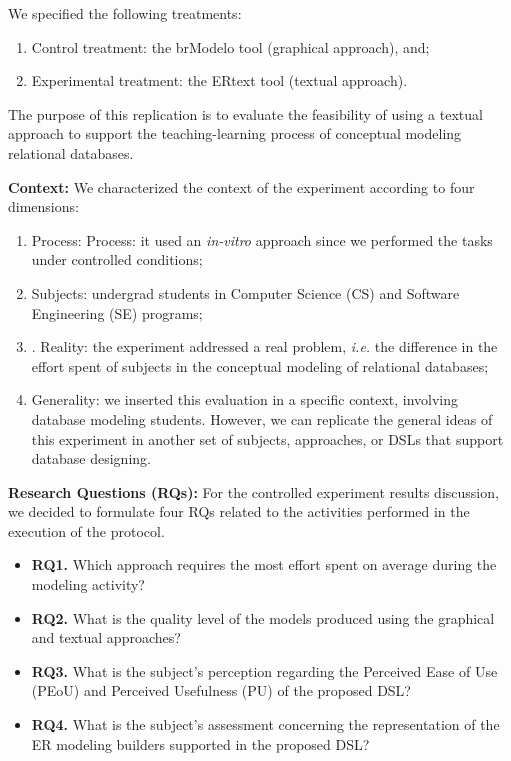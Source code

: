 We specified the following treatments:
\begin{enumerate} [label=\roman*.]
    \item Control treatment: the brModelo tool (graphical approach), and;
    \item Experimental treatment: the ERtext tool (textual approach).
\end{enumerate}
The purpose of this replication is to evaluate the feasibility of using a textual approach to support the teaching-learning process of conceptual modeling relational databases.

\textbf{Context:}
We characterized the context of the experiment according to four dimensions:
\begin{enumerate}[label=\roman*.]
    \item Process: Process: it used an \textit{in-vitro} approach since we performed the tasks under controlled conditions;
    \item Subjects: undergrad students in Computer Science (CS) and Software Engineering (SE) programs;
    \item. Reality: the experiment addressed a real problem, \textit{i.e.} the difference in the effort spent of subjects in the conceptual modeling of relational databases; 
    \item Generality: we inserted this evaluation in a specific context, involving database modeling students.
    However, we can replicate the general ideas of this experiment in another set of subjects, approaches, or DSLs that support database designing. 
\end{enumerate}

\textbf{Research Questions (RQs):}
For the controlled experiment results discussion, we decided to formulate four RQs related to the activities performed in the execution of the protocol.
\begin{itemize}
    \item \textbf{RQ1.} Which approach requires the most effort spent on average during the modeling activity?
    \item \textbf{RQ2.} What is the quality level of the models produced using the graphical and textual approaches?
    \item \textbf{RQ3.} What is the subject's perception regarding the Perceived Ease of Use (PEoU) and Perceived Usefulness (PU) of the proposed DSL?
    \item \textbf{RQ4.} What is the subject's assessment concerning the representation of the ER modeling builders supported in the proposed DSL?
\end{itemize}

